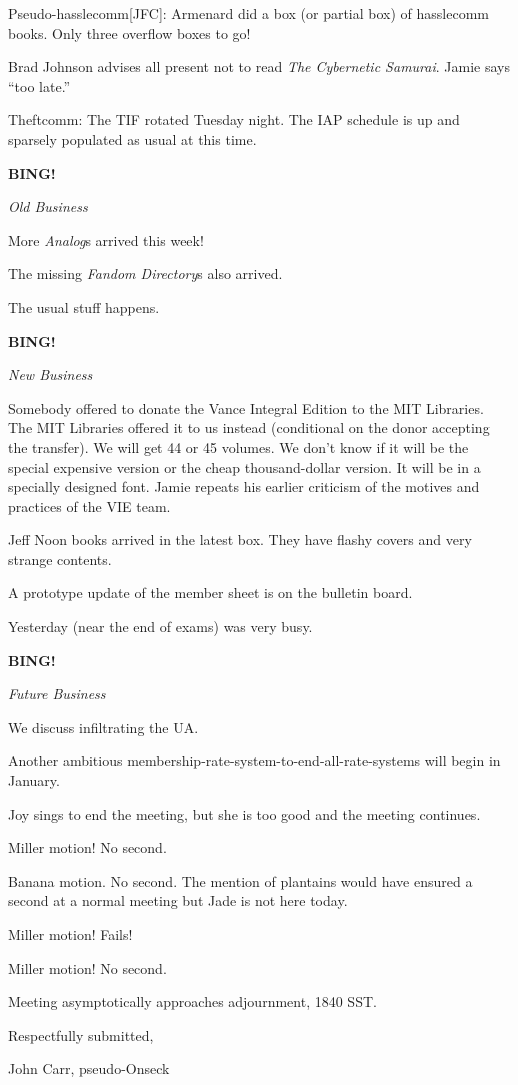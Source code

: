 \documentclass[12pt]{article}
\newcommand{\bing}{{\bf BING!} }
\newcommand{\goto}[1]{\bing \vskip 12pt \centerline{{\em{#1}}}}
\begin{document}
Pseudo-hasslecomm[JFC]:  Armenard did a box (or partial box) of hasslecomm
books.  Only three overflow boxes to go!

Brad Johnson advises all present not to read {\em The Cybernetic Samurai}.
Jamie says ``too late.''

Theftcomm: The TIF rotated Tuesday night.  The IAP schedule is up and
sparsely populated as usual at this time.

\goto{Old Business}

More {\em Analog}s arrived this week!

The missing {\em Fandom Directory}s also arrived.

The usual stuff happens.

\goto{New Business}

Somebody offered to donate the Vance Integral Edition to the MIT Libraries.
The MIT Libraries offered it to us instead (conditional on the donor accepting
the transfer).  We will get 44 or 45 volumes.  We don't know if it will be the
special expensive version or the cheap thousand-dollar version.  It will be in
a specially designed font.  Jamie repeats his earlier criticism of the motives
and practices of the VIE team.

Jeff Noon books arrived in the latest box.  They have flashy covers and
very strange contents.

A prototype update of the member sheet is on the bulletin board.

Yesterday (near the end of exams) was very busy.

\vspace{12pt}

\goto{Future Business}

We discuss infiltrating the UA.

Another ambitious membership-rate-system-to-end-all-rate-systems will begin in
January.

Joy sings to end the meeting, but she is too good and the meeting continues.

Miller motion!  No second.

Banana motion.  No second.  The mention of plantains would have ensured a
second at a normal meeting but Jade is not here today.

Miller motion!  Fails!

Miller motion!  No second.

\vspace{12pt}

\noindent
Meeting asymptotically approaches adjournment, 1840 SST.

\vspace{18pt}

\centerline{Respectfully submitted,}
\centerline{John Carr, pseudo-Onseck}
\end{document}
